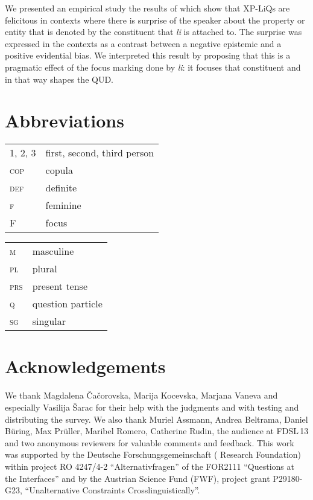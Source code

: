 \documentclass[output=paper,
colorlinks,
citecolor=brown,
newtxmath
]{langscibook}
\begin{document}
We presented an empirical study the results of which show that XP-LiQs are felicitous in contexts where there is surprise of the speaker about the property or entity that is denoted by the constituent that \textit{li} is attached to. The surprise was expressed in the contexts as a contrast between a negative epistemic and a positive evidential bias. We interpreted this result by proposing that this is a pragmatic effect of the focus marking done by \textit{li}: it focuses that constituent and in that way shapes the QUD.

\section*{Abbreviations}

\begin{tabularx}{.5\textwidth}{@{}lX}
\textsc{1, 2, 3}&first, second, third person\\
\textsc{cop}&{copula}\\
\textsc{def}&{definite}\\
\textsc{f}&{feminine}\\
\textsc{F}&{focus}\\
\end{tabularx}%
\begin{tabularx}{.5\textwidth}{lX@{}}
\textsc{m}&{masculine}\\
\textsc{pl}&{plural}\\
\textsc{prs}&{present tense}\\
\textsc{q}&{question particle}\\
\textsc{sg}&singular\\
\end{tabularx}

\section*{Acknowledgements}

We thank Magdalena Čačorovska, Marija Kocevska, Marjana Vaneva and especially Vasilija Šarac for their help with the  judgments and with testing and distributing the survey. We also thank Muriel Assmann, Andrea Beltrama, Daniel Büring, Max Prüller, Maribel Romero, Catherine Rudin, the audience at FDSL\,13 and two anonymous reviewers for valuable comments and feedback. This work was supported by the Deutsche Forschungsgemeinschaft ( Research Foundation) within project RO 4247/4-2 ``Alternativfragen'' of the FOR2111 ``Questions at the Interfaces'' and by the Austrian Science Fund (FWF), project grant P29180-G23, ``Unalternative Constraints Crosslinguistically''.

{\sloppy\printbibliography[heading=subbibliography,notkeyword=this]}
\end{document}
